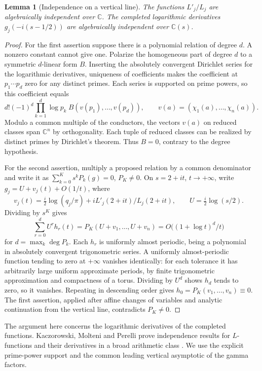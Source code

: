 \documentclass[11pt]{article}
\newtheorem{lemma}[theorem]{Lemma}
\newcommand{\CC}{\mathbb C}
\begin{document}
\begin{lemma}[Independence on a vertical line]\label{indep}
The functions $L'_j/L_j$ are algebraically independent over $\CC$. The completed logarithmic derivatives $g_j(-i(s-1/2))$ are algebraically independent over $\CC(s)$.
\end{lemma}
\begin{proof}
For the first assertion suppose there is a polynomial relation of degree $d$. A nonzero constant cannot give one. Polarize the homogeneous part of degree $d$ to a symmetric $d$-linear form $B$. Inserting the absolutely convergent Dirichlet series for the logarithmic derivatives, uniqueness of coefficients makes the coefficient at $p_1\cdots p_d$ zero for any distinct primes. Each series is supported on prime powers, so this coefficient equals
\[
 d!(-1)^d\prod_{k=1}^d\log p_k\; B(v(p_1),\ldots,v(p_d)),\qquad
 v(a)=(\chi_1(a),\ldots,\chi_n(a)).
\]
Modulo a common multiple of the conductors, the vectors $v(a)$ on reduced classes span $\CC^n$ by orthogonality. Each tuple of reduced classes can be realized by distinct primes by Dirichlet's theorem. Thus $B=0$, contrary to the degree hypothesis.

For the second assertion, multiply a proposed relation by a common denominator and write it as $\sum_{k=0}^K s^kP_k(g)=0$, $P_K\ne0$. On $s=2+it$, $t\to+\infty$, write $g_j=U+v_j(t)+O(1/t)$, where
\[
 v_j(t)=\tfrac i2\log(q_j/\pi)+i L'_j(2+it)/L_j(2+it),\qquad
 U=\tfrac i2\log(s/2).
\]
Dividing by $s^K$ gives
\[
 \sum_{r=0}^d U^r h_r(t)=P_K(U+v_1,\ldots,U+v_n)
       =O\bigl((1+\log t)^d/t\bigr)
\]
for $d=\max_k\deg P_k$. Each $h_r$ is uniformly almost periodic, being a polynomial in absolutely convergent trigonometric series. A uniformly almost-periodic function tending to zero at $+\infty$ vanishes identically: for each tolerance it has arbitrarily large uniform approximate periods, by finite trigonometric approximation and compactness of a torus. Dividing by $U^d$ shows $h_d$ tends to zero, so it vanishes. Repeating in descending order gives $h_0=P_K(v_1,\ldots,v_n)\equiv0$. The first assertion, applied after affine changes of variables and analytic continuation from the vertical line, contradicts $P_K\ne0$.
\end{proof}

The argument here concerns the logarithmic derivatives of the completed functions. Kaczorowski, Molteni and Perelli prove independence results for $L$-functions and their derivatives in a broad arithmetic class \cite{kmp}. We use the explicit prime-power support and the common leading vertical asymptotic of the gamma factors.
\end{document}
